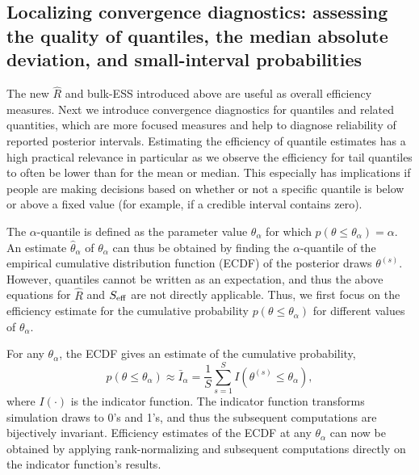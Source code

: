\documentclass[american,]{article}
\begin{document}
\hypertarget{convergence-diagnostics-for-quantiles}{%
\subsection{Localizing convergence diagnostics: assessing the quality of quantiles, the median absolute deviation, and small-interval probabilities }\label{convergence-diagnostics-for-quantiles}}

The new \(\widehat{R}\) and bulk-ESS introduced above are useful as overall efficiency
measures. Next we introduce
convergence diagnostics for quantiles and related quantities, which are more focused measures and help to diagnose reliability of  reported
posterior intervals. Estimating
the efficiency of quantile estimates has a high practical
relevance in particular as we observe the efficiency for tail quantiles
to often be lower than for the mean or median.  This especially has implications
if people are making decisions based on whether or not a specific quantile
is below or above a fixed value (for example, if a credible interval contains zero).

The \(\alpha\)-quantile
is defined as the parameter value \(\theta_\alpha\) for which
\(p(\theta \leq \theta_\alpha) = \alpha\). An estimate
\(\hat{\theta}_\alpha\) of \(\theta_\alpha\) can thus be obtained by
finding the \(\alpha\)-quantile of the empirical cumulative distribution function (ECDF) of the
posterior draws \(\theta^{(s)}\). However, quantiles cannot be written
as an expectation, and thus the above equations for \(\widehat{R}\) and
\(S_{\rm eff}\) are not directly applicable. Thus, we first focus on the
efficiency estimate for the cumulative probability
\(p(\theta \leq \theta_\alpha)\) for different values of
\(\theta_\alpha\).

For any \(\theta_\alpha\), the ECDF gives an estimate of the cumulative
probability,
\begin{equation}
p(\theta \leq \theta_\alpha) \approx \bar{I}_\alpha = \frac{1}{S}\sum_{s=1}^S
I(\theta^{(s)} \leq\theta_\alpha),
\end{equation}
where \(I(\cdot)\) is the indicator function. The indicator function
transforms simulation draws to 0's and 1's, and thus the subsequent
computations are bijectively invariant. Efficiency estimates of the ECDF
at any \(\theta_\alpha\) can now be obtained by applying
rank-normalizing and subsequent computations directly on the indicator
function's results.
\end{document}
